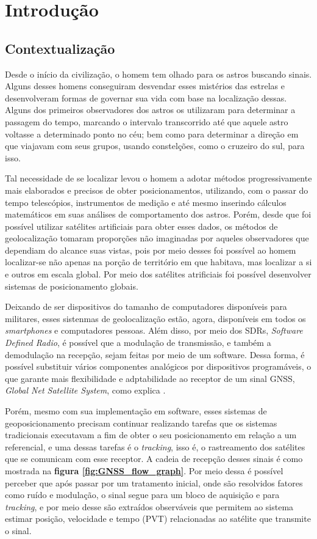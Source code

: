 \chapter[Introdução]{Introdução}

\section{Contextualização}

Desde o início da civilização, o homem tem olhado para os astros buscando sinais. Alguns desses homens conseguiram desvendar esses mistérios das estrelas e desenvolveram formas de governar sua vida com base na localização dessas. Alguns dos primeiros observadores dos astros os utilizaram para determinar a passagem do tempo, marcando o intervalo transcorrido até que aquele astro voltasse a determinado ponto no céu; bem como para determinar a direção em que viajavam com seus grupos, usando constelções, como o cruzeiro do sul, para isso.

Tal necessidade de se localizar levou o homem a adotar métodos progressivamente mais elaborados e precisos de obter posicionamentos, utilizando, com o passar do tempo telescópios, instrumentos de medição  e até mesmo inserindo cálculos matemáticos em suas análises de comportamento dos astros. Porém, desde que foi possível utilizar satélites artificiais para obter esses dados, os métodos de geolocalização tomaram proporções não imaginadas por aqueles observadores que dependiam do alcance suas vistas, pois por meio desses foi possível ao homem localizar-se não apenas na porção de território em que habitava, mas localizar a si e outros em escala global. Por meio dos satélites atrificiais foi possível desenvolver sistemas de posicionamento globais. 

Deixando de ser dispositivos do tamanho de computadores disponíveis para militares, esses sistenmas de geolocalização estão, agora, disponíveis em todos os \textit{smartphones} e computadores pessoas. Além disso, por meio dos SDRs, \textit{Software Defined Radio}, é possível que a modulação de transmissão, e também a demodulação na recepção, sejam feitas por meio de um software. Dessa forma, é possível substituir vários componentes analógicos por dispositivos programáveis, o que garante mais flexibilidade e adptabilidade ao receptor de um sinal GNSS, \textit{Global Net Satellite System}, como explica \cite{MSadiku}.

Porém, mesmo com sua implementação em software, esses sistemas de geoposicionamento precisam continuar realizando tarefas que os sistemas tradicionais executavam a fim de obter o seu posicionamento em relação a um referencial, e uma dessas tarefas é o \textit{tracking}, isso é, o rastreamento dos satélites que se comunicam com esse receptor. A cadeia de recepção desses sinais é como mostrada na \textbf{figura \ref{fig:GNSS_flow_graph}}. Por meio dessa é possível perceber que após passar por um tratamento inicial, onde são resolvidos fatores como ruído e modulação, o sinal segue para um bloco de aquisição e para \textit{tracking}, e por meio desse são extraídos observáveis que permitem ao sistema estimar posição, velocidade e tempo (PVT) relacionadas ao satélite que transmite o sinal. 

